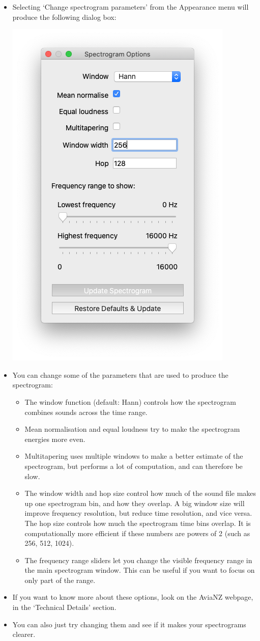 \documentclass{article}
\begin{document}
\begin{itemize}
\item Selecting `Change spectrogram parameters' from the Appearance menu will produce the following dialog box:

\begin{center}
    \includegraphics[width=.5\textwidth]{Figures/SpectrogramOptions}
\end{center}

\item You can change some of the parameters that are used to produce the spectrogram:

\begin{itemize}
\item The window function (default: Hann) controls how the spectrogram combines sounds across the time range. 
\item Mean normalisation and equal loudness try to make the spectrogram energies more even.
\item Multitapering uses multiple windows to make a better estimate of the spectrogram, but performs a lot of computation, and can therefore be slow.
\item The window width and hop size control how much of the sound file makes up one spectrogram bin, and how they overlap. A big window size will improve frequency resolution, but reduce time resolution, and vice versa. The hop size controls how much the spectrogram time bins overlap. It is computationally more efficient if these numbers are powers of 2 (such as 256, 512, 1024).
\item The frequency range sliders let you change the visible frequency range in the main spectrogram window. This can be useful if you want to focus on only part of the range.
\end{itemize}

\item If you want to know more about these options, look on the AviaNZ webpage, in the `Technical Details' section. 
\item You can also just try changing them and see if it makes your spectrograms clearer.
\end{itemize}
\end{document}
